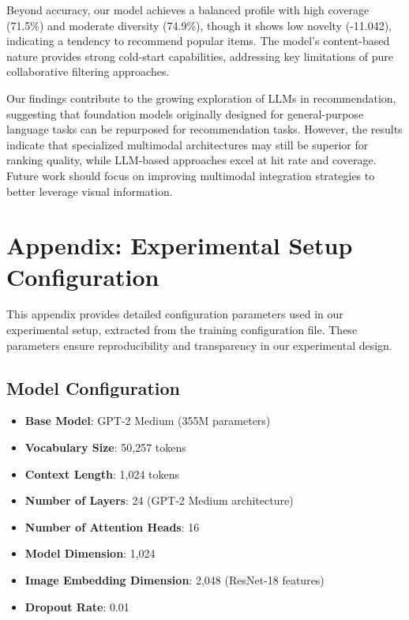 \documentclass[conference]{IEEEtran}
\begin{document}
Beyond accuracy, our model achieves a balanced profile with high coverage (71.5\%) and moderate diversity (74.9\%), though it shows low novelty (-11.042), indicating a tendency to recommend popular items. The model's content-based nature provides strong cold-start capabilities, addressing key limitations of pure collaborative filtering approaches.

Our findings contribute to the growing exploration of LLMs in recommendation, suggesting that foundation models originally designed for general-purpose language tasks can be repurposed for recommendation tasks. However, the results indicate that specialized multimodal architectures may still be superior for ranking quality, while LLM-based approaches excel at hit rate and coverage. Future work should focus on improving multimodal integration strategies to better leverage visual information. 



\section*{Appendix: Experimental Setup Configuration}

This appendix provides detailed configuration parameters used in our experimental setup, extracted from the training configuration file. These parameters ensure reproducibility and transparency in our experimental design.

\subsection*{Model Configuration}
\begin{itemize}
    \item \textbf{Base Model}: GPT-2 Medium (355M parameters)
    \item \textbf{Vocabulary Size}: 50,257 tokens
    \item \textbf{Context Length}: 1,024 tokens
    \item \textbf{Number of Layers}: 24 (GPT-2 Medium architecture)
    \item \textbf{Number of Attention Heads}: 16
    \item \textbf{Model Dimension}: 1,024
    \item \textbf{Image Embedding Dimension}: 2,048 (ResNet-18 features)
    \item \textbf{Dropout Rate}: 0.01
\end{itemize}
\end{document}
